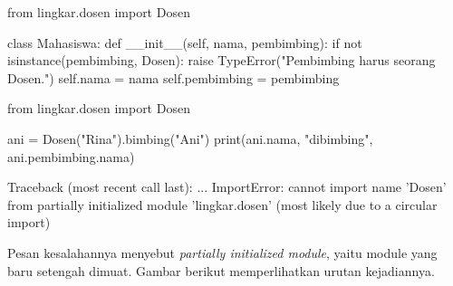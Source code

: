 \begin{kode}
from lingkar.dosen import Dosen

class Mahasiswa:
    def __init__(self, nama, pembimbing):
        if not isinstance(pembimbing, Dosen):
            raise TypeError("Pembimbing harus seorang Dosen.")
        self.nama = nama
        self.pembimbing = pembimbing
\end{kode}

\begin{kode}[main.py]
from lingkar.dosen import Dosen

ani = Dosen("Rina").bimbing("Ani")
print(ani.nama, "dibimbing", ani.pembimbing.nama)
\end{kode}

\begin{keluaran}
Traceback (most recent call last):
  ...
ImportError: cannot import name 'Dosen' from partially initialized module 'lingkar.dosen' (most likely due to a circular import)
\end{keluaran}

Pesan kesalahannya menyebut \emph{partially initialized module}, yaitu module yang baru setengah dimuat. Gambar berikut memperlihatkan urutan kejadiannya.

